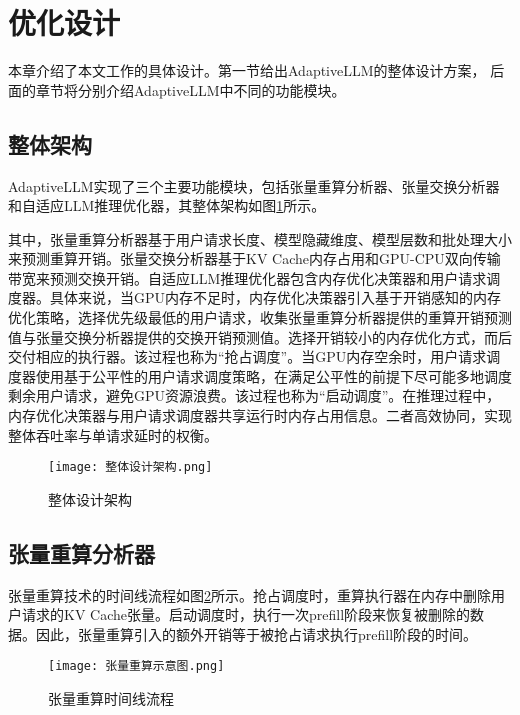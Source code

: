 \section{优化设计}

本章介绍了本文工作的具体设计。第一节给出AdaptiveLLM的整体设计方案， 后面的章节将分别介绍AdaptiveLLM中不同的功能模块。

\subsection{整体架构}

AdaptiveLLM实现了三个主要功能模块，包括张量重算分析器、张量交换分析器和自适应LLM推理优化器，其整体架构如图\ref{Fig:整体设计架构}所示。

其中，张量重算分析器基于用户请求长度、模型隐藏维度、模型层数和批处理大小来预测重算开销。张量交换分析器基于KV Cache内存占用和GPU-CPU双向传输带宽来预测交换开销。自适应LLM推理优化器包含内存优化决策器和用户请求调度器。具体来说，当GPU内存不足时，内存优化决策器引入基于开销感知的内存优化策略，选择优先级最低的用户请求，收集张量重算分析器提供的重算开销预测值与张量交换分析器提供的交换开销预测值。选择开销较小的内存优化方式，而后交付相应的执行器。该过程也称为“抢占调度”。当GPU内存空余时，用户请求调度器使用基于公平性的用户请求调度策略，在满足公平性的前提下尽可能多地调度剩余用户请求，避免GPU资源浪费。该过程也称为“启动调度”。在推理过程中，内存优化决策器与用户请求调度器共享运行时内存占用信息。二者高效协同，实现整体吞吐率与单请求延时的权衡。

\begin{figure}[!htbp]
  \centering
  \texttt{[image: 整体设计架构.png]}
  \caption{整体设计架构}
  \label{Fig:整体设计架构}
\end{figure}

\subsection{张量重算分析器}

张量重算技术的时间线流程如图\ref{Fig:张量重算示意图}所示。抢占调度时，重算执行器在内存中删除用户请求的KV Cache张量。启动调度时，执行一次prefill阶段来恢复被删除的数据。因此，张量重算引入的额外开销等于被抢占请求执行prefill阶段的时间。

\begin{figure}[!htbp]
  \centering
  \texttt{[image: 张量重算示意图.png]}
  \caption{张量重算时间线流程}
  \label{Fig:张量重算示意图}
\end{figure}

